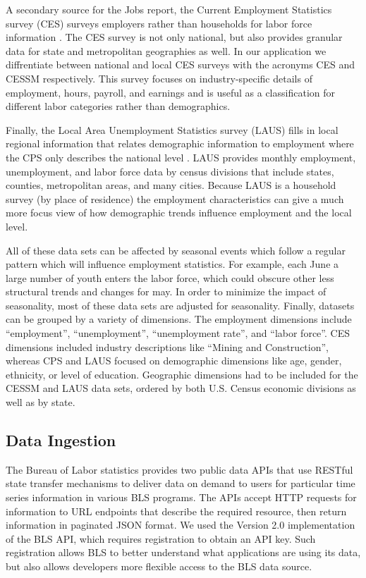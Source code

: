 \documentclass{sigchi}
\begin{document}
A secondary source for the Jobs report, the Current Employment Statistics survey (CES) surveys employers rather than households for labor force information \cite{_current_2015}. The CES survey is not only national, but also provides granular data for state and metropolitan geographies as well. In our application we diffrentiate between national and local CES surveys with the acronyms CES and CESSM respectively. This survey focuses on industry-specific details of employment, hours, payroll, and earnings and is useful as a classification for different labor categories rather than demographics.

Finally, the Local Area Unemployment Statistics survey (LAUS) fills in local regional information that relates demographic information to employment where the CPS only describes the national level \cite{_local_2015}. LAUS provides monthly employment, unemployment, and labor force data by census divisions that include states, counties, metropolitan areas, and many cities. Because LAUS is a household survey (by place of residence) the employment characteristics can give a much more focus view of how demographic trends influence employment and the local level.

All of these data sets can be affected by seasonal events which follow a regular pattern which will influence employment statistics. For example, each June a large number of youth enters the labor force, which could obscure other less structural trends and changes for may. In order to minimize the impact of seasonality, most of these data sets are adjusted for seasonality. Finally, datasets can be grouped by a variety of dimensions. The employment dimensions include ``employment'', ``unemployment'', ``unemployment rate'', and ``labor force''. CES dimensions included industry descriptions like ``Mining and Construction'', whereas CPS and LAUS focused on demographic dimensions like age, gender, ethnicity, or level of education. Geographic dimensions had to be included for the CESSM and LAUS data sets, ordered by both U.S. Census economic divisions as well as by state.

\subsection{Data Ingestion}

The Bureau of Labor statistics provides two public data APIs that use RESTful state transfer mechanisms to deliver data on demand to users for particular time series information in various BLS programs. The APIs accept HTTP requests for information to URL endpoints that describe the required resource, then return information in paginated JSON format. We used the Version 2.0 implementation of the BLS API, which requires registration to obtain an API key. Such registration allows BLS to better understand what applications are using its data, but also allows developers more flexible access to the BLS data source.
\end{document}
